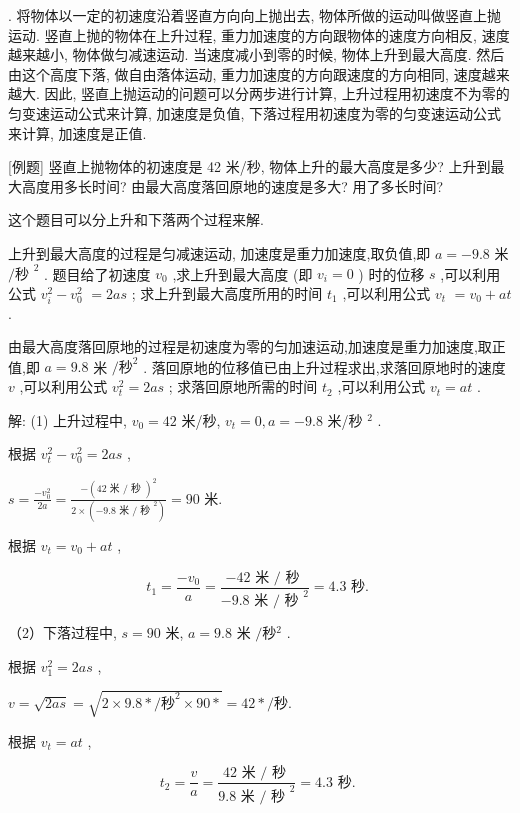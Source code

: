 \documentclass[10pt]{article}
\begin{document}
. 将物体以一定的初速度沿着竖直方向向上抛出去, 物体所做的运动叫做竖直上抛运动. 竖直上抛的物体在上升过程, 重力加速度的方向跟物体的速度方向相反, 速度越来越小, 物体做匀减速运动. 当速度减小到零的时候, 物体上升到最大高度. 然后由这个高度下落, 做自由落体运动, 重力加速度的方向跟速度的方向相同, 速度越来越大. 因此, 竖直上抛运动的问题可以分两步进行计算, 上升过程用初速度不为零的匀变速运动公式来计算, 加速度是负值, 下落过程用初速度为零的匀变速运动公式来计算, 加速度是正值.

[例题] 竖直上抛物体的初速度是 42 米/秒, 物体上升的最大高度是多少? 上升到最大高度用多长时间? 由最大高度落回原地的速度是多大? 用了多长时间?

这个题目可以分上升和下落两个过程来解.

上升到最大高度的过程是匀减速运动, 加速度是重力加速度,取负值,即 \(a = - {9.8}\) 米 \(/{\text{秒 }}^{2}\) . 题目给了初速度 \({v}_{0}\) ,求上升到最大高度 (即 \({v}_{i} = 0\) ) 时的位移 \(s\) ,可以利用公式 \({v}_{i}^{2} - {v}_{0}^{2}\) \(= {2as}\) ; 求上升到最大高度所用的时间 \({t}_{1}\) ,可以利用公式 \({v}_{t}\) \(= {v}_{0} + {at}\) .

由最大高度落回原地的过程是初速度为零的匀加速运动,加速度是重力加速度,取正值,即 \(a = {9.8}\) 米 \(/{\text{秒}}^{2}\) . 落回原地的位移值已由上升过程求出,求落回原地时的速度 \(v\) ,可以利用公式 \({v}_{t}^{2} = {2as}\) ; 求落回原地所需的时间 \({t}_{2}\) ,可以利用公式 \({v}_{t} = {at}\) .

解: (1) 上升过程中, \({v}_{0} = {42}\) 米/秒, \({v}_{t} = 0,a = - {9.8}\) 米/秒 \({}^{2}\) .

根据 \({v}_{t}^{2} - {v}_{0}^{2} = {2as}\) ,

\(s = \frac{-{v}_{0}^{2}}{2a} = \frac{-{\left( {42}\text{ 米 }/\text{ 秒 }\right) }^{2}}{2 \times \left( {-{9.8}\text{ 米 }/{\text{ 秒 }}^{2}}\right) } = {90}\) 米.

根据 \({v}_{t} = {v}_{0} + {at}\) ,

\[
{t}_{1} = \frac{-{v}_{0}}{a} = \frac{-{42}\text{ 米 }/\text{ 秒 }}{-{9.8}\text{ 米 }/{\text{ 秒 }}^{2}} = {4.3}\text{ 秒. }
\]

（2）下落过程中, \(s = {90}\) 米, \(a = {9.8}\) 米 \(/秒{}^{2}\) .

根据 \({v}_{1}^{2} = {2as}\) ,

\(v = \sqrt{2as} = \sqrt{2 \times {9.8} * /{秒}^{2} \times {90} * } = {42} * /秒.\)

根据 \({v}_{t} = {at}\) ,

\[
{t}_{2} = \frac{v}{a} = \frac{{42}\text{ 米 }/\text{ 秒 }}{{9.8}\text{ 米 }/{\text{ 秒 }}^{2}} = {4.3}\text{ 秒. }
\]
\end{document}
